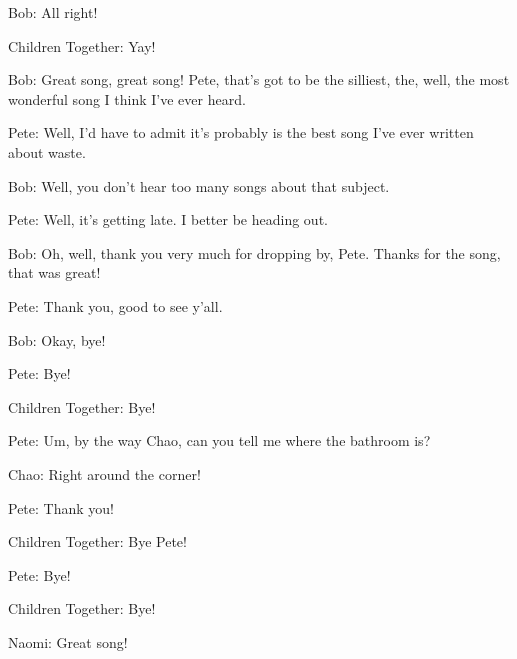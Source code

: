 Bob: All right!

Children Together: Yay!

Bob: Great song, great song! Pete, that's got to be the silliest, the, well, the most wonderful song I think I've ever heard.

Pete: Well, I'd have to admit it's probably is the best song I've ever written about waste.

Bob: Well, you don't hear too many songs about that subject.

Pete: Well, it's getting late. I better be heading out.

Bob: Oh, well, thank you very much for dropping by, Pete. Thanks for the song, that was great!

Pete: Thank you, good to see y'all.

Bob: Okay, bye!

Pete: Bye!

Children Together: Bye!

Pete: Um, by the way Chao, can you tell me where the bathroom is?

Chao: Right around the corner!

Pete: Thank you!

Children Together: Bye Pete!

Pete: Bye!

Children Together: Bye!

Naomi: Great song!

